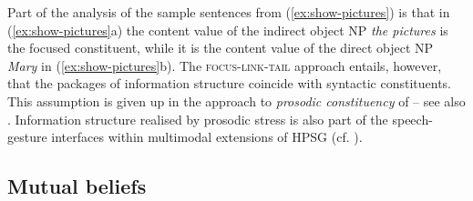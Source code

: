 \documentclass[output=paper]{langsci/langscibook}
\begin{document}
{Part of the analysis of the sample sentences from (\ref{ex:show-pictures}) is that in (\ref{ex:show-pictures}a) the content value of the indirect object NP \textit{the pictures} is the focused constituent, while it is the content value of the direct object NP \textit{Mary} in (\ref{ex:show-pictures}b).
%
The \textsc{focus-link-tail} approach entails, however, that the packages of information structure coincide with syntactic constituents.
 
%
This assumption is given up in the approach to \emph{prosodic constituency}  of \citet{Klein:2000} -- see also .
%
Information structure realised by prosodic stress is also part of the speech-gesture interfaces within multimodal extensions of HPSG (cf. ).
  



\subsection{Mutual beliefs}
\label{sec:mutual-beliefs}

}
\end{document}
